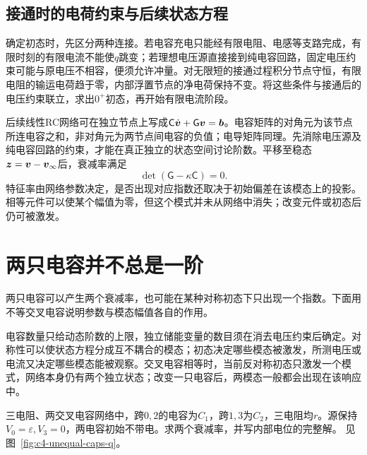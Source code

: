 \subsection{接通时的电荷约束与后续状态方程}
确定初态时，先区分两种连接。若电容充电只能经有限电阻、电感等支路完成，有限时刻的有限电流不能使$q$跳变；若理想电压源直接接到纯电容回路，固定电压约束可能与原电压不相容，便须允许冲量。对无限短的接通过程积分节点守恒，有限电阻的输运电荷趋于零，内部浮置节点的净电荷保持不变。将这些条件与接通后的电压约束联立，求出$0^+$初态，再开始有限电流阶段。

后续线性RC网络可在独立节点上写成$\mathsf C\dot{\bm{v}}+\mathsf G\bm{v}=\bm{b}$。电容矩阵的对角元为该节点所连电容之和，非对角元为两节点间电容的负值；电导矩阵同理。先消除电压源及纯电容回路的约束，才能在真正独立的状态空间讨论阶数。平移至稳态$\bm{z}=\bm{v}-\bm{v}_\infty$后，衰减率满足
\[
 \det(\mathsf G-\kappa\mathsf C)=0.
\]
特征率由网络参数决定，是否出现对应指数还取决于初始偏差在该模态上的投影。相等元件可以使某个幅值为零，但这个模式并未从网络中消失；改变元件或初态后仍可被激发。


\section{两只电容并不总是一阶}
两只电容可以产生两个衰减率，也可能在某种对称初态下只出现一个指数。下面用不等交叉电容说明参数与模态幅值各自的作用。

电容数量只给动态阶数的上限，独立储能变量的数目须在消去电压约束后确定。对称性可以使状态方程分成互不耦合的模态；初态决定哪些模态被激发，所测电压或电流又决定哪些模态能被观察。交叉电容相等时，当前反对称初态只激发一个模式，网络本身仍有两个独立状态；改变一只电容后，两模态一般都会出现在该响应中。

\begin{example}[不等交叉电容的两个衰减率]\label{ex:c4-unequal-caps}
三电阻、两交叉电容网络中，跨$0,2$的电容为$C_1$，跨$1,3$为$C_2$，三电阻均$r$。源保持$V_0=\varepsilon,V_3=0$，两电容初始不带电。求两个衰减率，并写内部电位的完整解。 见图~\ref{fig:c4-unequal-caps-q}。
\end{example}

